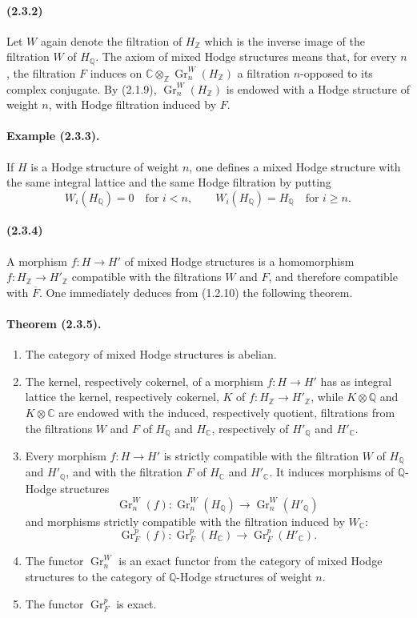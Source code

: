 \documentclass[10pt]{article}
\newcommand{\C}{\mathbb C}
\newcommand{\Q}{\mathbb Q}
\newcommand{\Z}{\mathbb Z}
\newcommand{\Gr}{\operatorname{Gr}}
\begin{document}
\paragraph{(2.3.2)} Let $W$ again denote the filtration of $H_\Z$ which is the inverse image of the filtration $W$ of $H_\Q$. The axiom of mixed Hodge structures means that, for every $n$, the filtration $F$ induces on $\C\otimes_\Z\Gr_n^W(H_\Z)$ a filtration $n$-opposed to its complex conjugate. By (2.1.9), $\Gr_n^W(H_\Z)$ is endowed with a Hodge structure of weight $n$, with Hodge filtration induced by $F$.

\paragraph{Example (2.3.3).} If $H$ is a Hodge structure of weight $n$, one defines a mixed Hodge structure with the same integral lattice and the same Hodge filtration by putting
\[
W_i(H_\Q)=0\quad\text{for }i<n,\qquad
W_i(H_\Q)=H_\Q\quad\text{for }i\ge n.
\]

\paragraph{(2.3.4)} A morphism $f:H\to H'$ of mixed Hodge structures is a homomorphism $f:H_\Z\to H'_\Z$ compatible with the filtrations $W$ and $F$, and therefore compatible with $\overline F$. One immediately deduces from (1.2.10) the following theorem.

\paragraph{Theorem (2.3.5).}
\begin{enumerate}[label=(\roman*)]
\item The category of mixed Hodge structures is abelian.
\item The kernel, respectively cokernel, of a morphism $f:H\to H'$ has as integral lattice the kernel, respectively cokernel, $K$ of $f:H_\Z\to H'_\Z$, while $K\otimes\Q$ and $K\otimes\C$ are endowed with the induced, respectively quotient, filtrations from the filtrations $W$ and $F$ of $H_\Q$ and $H_\C$, respectively of $H'_\Q$ and $H'_\C$.
\item Every morphism $f:H\to H'$ is strictly compatible with the filtration $W$ of $H_\Q$ and $H'_\Q$, and with the filtration $F$ of $H_\C$ and $H'_\C$. It induces morphisms of $\Q$-Hodge structures
\[
\Gr_n^W(f):\Gr_n^W(H_\Q)\longrightarrow\Gr_n^W(H'_\Q)
\]
and morphisms strictly compatible with the filtration induced by $W_\C$:
\[
\Gr_F^p(f):\Gr_F^p(H_\C)\longrightarrow\Gr_F^p(H'_\C).
\]
\item The functor $\Gr_n^W$ is an exact functor from the category of mixed Hodge structures to the category of $\Q$-Hodge structures of weight $n$.
\item The functor $\Gr_F^p$ is exact.
\end{enumerate}
\end{document}
